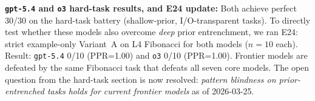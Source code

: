 \textbf{\texttt{gpt-5.4} and \texttt{o3} hard-task results, and E24 update:} Both achieve perfect 30/30 on the hard-task battery (shallow-prior, I/O-transparent tasks). To directly test whether these models also overcome \emph{deep} prior entrenchment, we ran E24: strict example-only Variant~A on L4 Fibonacci for both models ($n=10$ each). Result: \texttt{gpt-5.4} 0/10 (PPR=1.00) and \texttt{o3} 0/10 (PPR=1.00). Frontier models are defeated by the same Fibonacci task that defeats all seven core models. The open question from the hard-task section is now resolved: \emph{pattern blindness on prior-entrenched tasks holds for current frontier models} as of 2026-03-25.
